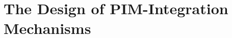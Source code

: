 
\newpage
\section{The Design of PIM-Integration Mechanisms}
\label{discussion:design-guidelines-discussion}

